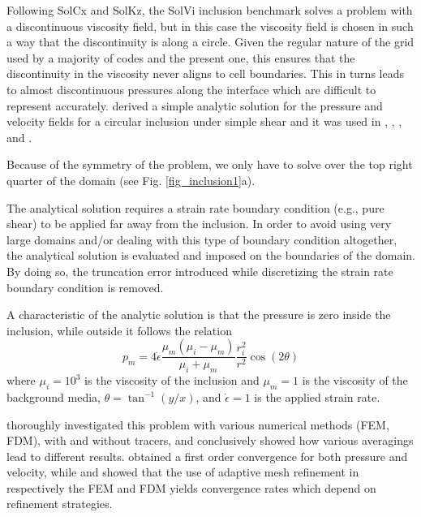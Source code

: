 
Following SolCx and SolKz, the SolVi inclusion benchmark solves 
a problem with a discontinuous viscosity field, but in this case 
the viscosity field is chosen in such a way that the discontinuity 
is along a circle. Given the regular nature of the grid used by a majority of codes and the present one, 
this ensures that the discontinuity in the viscosity never aligns to cell boundaries.
This in turns leads to almost discontinuous pressures along the interface which are difficult to represent accurately.
\cite{scpo03} derived a simple analytic solution for the pressure and velocity fields for a circular 
inclusion under simple shear and it was used in \cite{deka08}, \cite{sunh10}, \cite{dumg11}, \cite{krhb12} and \cite{gemd13}.

Because of the symmetry of the problem, we only have to solve over the top right quarter of the domain (see Fig. \ref{fig_inclusion1}a). 

The analytical solution requires a strain rate boundary condition (e.g., pure shear) to be applied far away 
from the inclusion. In order to avoid using very large domains and/or dealing with this type of boundary condition altogether, 
the analytical solution is evaluated and imposed on the boundaries of the domain. 
By doing so, the truncation error introduced while discretizing the strain rate boundary condition is removed.

A characteristic of the analytic solution is that the pressure is zero inside the inclusion, while outside it follows the relation
\begin{equation}
p_m = 4 \dot{\epsilon}
\frac{\mu_m(\mu_i-\mu_m)}{\mu_i+\mu_m}
\frac{r_i^2}{r^2} \cos(2\theta)
\end{equation}
where $\mu_i = 10^3$ is the viscosity of the inclusion and $\mu_m = 1$ is the viscosity of the background media, $\theta=\tan^{-1}(y/x)$,
and $\dot{\epsilon}=1$ is the applied strain rate.

\cite{deka08} thoroughly investigated this problem with various numerical methods (FEM, FDM), with and without tracers, 
and conclusively showed how various averagings lead to different results. 
\cite{dumg11} obtained a first order convergence for both pressure and velocity, while \cite{krhb12}
and \cite{gemd13} showed that the use of adaptive mesh refinement in respectively the FEM and FDM 
yields convergence rates which depend on refinement strategies. 

